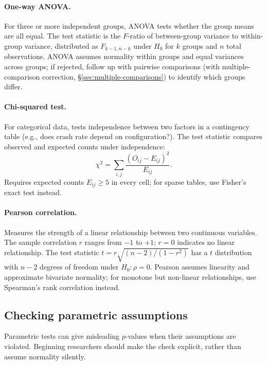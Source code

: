 \documentclass[11pt]{article}
\begin{document}
\paragraph{One-way ANOVA.} For three or more independent groups, ANOVA tests whether the group means are all equal. The test statistic is the $F$-ratio of between-group variance to within-group variance, distributed as $F_{k-1, n-k}$ under $H_0$ for $k$ groups and $n$ total observations. ANOVA assumes normality within groups and equal variances across groups; if rejected, follow up with pairwise comparisons (with multiple-comparison correction, \S\ref{sec:multiple-comparisons}) to identify which groups differ.

\paragraph{Chi-squared test.} For categorical data, tests independence between two factors in a contingency table (e.g., does crash rate depend on configuration?). The test statistic compares observed and expected counts under independence:
\begin{equation}
\chi^2 = \sum_{i,j} \frac{(O_{ij} - E_{ij})^2}{E_{ij}}.
\end{equation}
Requires expected counts $E_{ij} \geq 5$ in every cell; for sparse tables, use Fisher's exact test instead.

\paragraph{Pearson correlation.} Measures the strength of a linear relationship between two continuous variables. The sample correlation $r$ ranges from $-1$ to $+1$; $r = 0$ indicates no linear relationship. The test statistic $t = r \sqrt{(n-2)/(1-r^2)}$ has a $t$ distribution with $n-2$ degrees of freedom under $H_0: \rho = 0$. Pearson assumes linearity and approximate bivariate normality; for monotone but non-linear relationships, use Spearman's rank correlation instead.

\subsection{Checking parametric assumptions}
\label{sec:assumptions}

Parametric tests can give misleading $p$-values when their assumptions are violated. Beginning researchers should make the check explicit, rather than assume normality silently.
\end{document}
